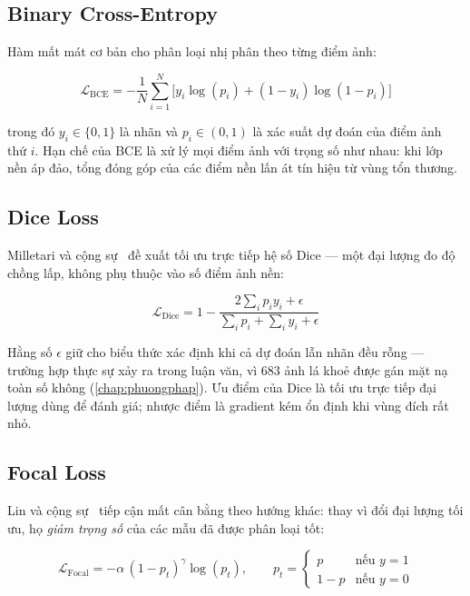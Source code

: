 \subsection{Binary Cross-Entropy}

Hàm mất mát cơ bản cho phân loại nhị phân theo từng điểm ảnh:

\begin{equation}
    \mathcal{L}_{\text{BCE}} = -\frac{1}{N}\sum_{i=1}^{N}
        \Big[ y_i \log(p_i) + (1 - y_i)\log(1 - p_i) \Big]
    \label{eq:bce}
\end{equation}

trong đó $y_i \in \{0,1\}$ là nhãn và $p_i \in (0,1)$ là xác suất dự đoán của
điểm ảnh thứ $i$. Hạn chế của BCE là xử lý mọi điểm ảnh với trọng số như nhau:
khi lớp nền áp đảo, tổng đóng góp của các điểm nền lấn át tín hiệu từ vùng tổn
thương.

\subsection{Dice Loss}

Milletari và cộng sự~\cite{milletari2016vnet} đề xuất tối ưu trực tiếp hệ số Dice
--- một đại lượng đo độ chồng lấp, không phụ thuộc vào số điểm ảnh nền:

\begin{equation}
    \mathcal{L}_{\text{Dice}} = 1 - \frac{2\sum_{i} p_i y_i + \epsilon}
                                         {\sum_{i} p_i + \sum_{i} y_i + \epsilon}
    \label{eq:dice}
\end{equation}

Hằng số $\epsilon$ giữ cho biểu thức xác định khi cả dự đoán lẫn nhãn đều rỗng
--- trường hợp thực sự xảy ra trong luận văn, vì \num{683} ảnh lá khoẻ được gán
mặt nạ toàn số không (\cref{chap:phuongphap}). Ưu điểm của Dice là tối ưu trực
tiếp đại lượng dùng để đánh giá; nhược điểm là gradient kém ổn định khi vùng đích
rất nhỏ.

\subsection{Focal Loss}

Lin và cộng sự~\cite{lin2017focal} tiếp cận mất cân bằng theo hướng khác: thay vì
đổi đại lượng tối ưu, họ \emph{giảm trọng số} của các mẫu đã được phân loại tốt:

\begin{equation}
    \mathcal{L}_{\text{Focal}} = -\alpha \,(1 - p_t)^{\gamma} \log(p_t),
    \qquad
    p_t = \begin{cases} p & \text{nếu } y = 1 \\ 1 - p & \text{nếu } y = 0 \end{cases}
    \label{eq:focal}
\end{equation}

